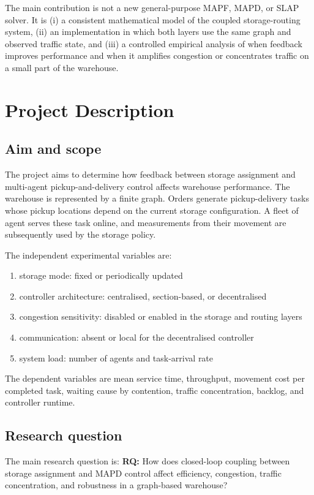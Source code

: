 The main contribution is not a new general-purpose MAPF, MAPD, or SLAP solver. It is (i) a consistent mathematical model of the coupled storage-routing system, (ii) an implementation in which both layers use the same graph and observed traffic state, and (iii) a controlled empirical analysis of when feedback improves performance and when it amplifies congestion or concentrates traffic on a small part of the warehouse.

\section{Project Description}
\label{sec:project-description}

\subsection{Aim and scope}
\label{sec:pd-aim-and-scope}
The project aims to determine how feedback between storage assignment and multi-agent pickup-and-delivery control affects warehouse performance. The warehouse is represented by a finite graph. Orders generate pickup-delivery tasks whose pickup locations depend on the current storage configuration. A fleet of agent serves these task online, and measurements from their movement are subsequently  used by the storage policy.

The independent experimental variables are:
\begin{enumerate}
    \item storage mode: fixed or periodically updated
    \item controller architecture: centralised, section-based, or decentralised
    \item congestion sensitivity: disabled or enabled in the storage and routing layers
    \item communication: absent or local for the decentralised controller
    \item system load: number of agents and task-arrival rate
\end{enumerate}
The dependent variables are mean service time, throughput, movement cost per completed task, waiting cause by contention, traffic concentration, backlog, and controller runtime.

\subsection{Research question}
\label{sec:pd-rq}
The main research question is: \newline
\textbf{RQ:} How does closed-loop coupling between storage assignment and MAPD
control affect efficiency, congestion, traffic concentration, and robustness
in a graph-based warehouse?\\

